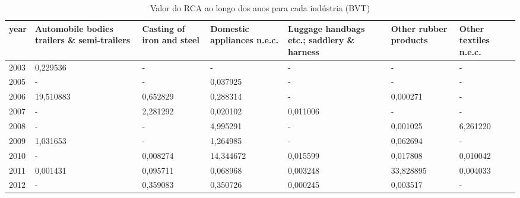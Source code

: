 \begin{table}
\centering
\caption{Valor do RCA ao longo dos anos para cada indústria (BVT)}
\begin{tabular}{p{1cm}p{2cm}p{2cm}p{2cm}p{2cm}p{2cm}p{2cm}}
\toprule
 year &  Automobile bodies trailers \& semi-trailers &  Casting of iron and steel &  Domestic appliances n.e.c. &  Luggage handbags etc.; saddlery \& harness &  Other rubber products &  Other textiles n.e.c. \\
\midrule
 2003 &                                    0,229536 &                          - &                           - &                                          - &                      - &                      - \\
 2005 &                                           - &                          - &                    0,037925 &                                          - &                      - &                      - \\
 2006 &                                   19,510883 &                   0,652829 &                    0,288314 &                                          - &               0,000271 &                      - \\
 2007 &                                           - &                   2,281292 &                    0,020102 &                                   0,011006 &                      - &                      - \\
 2008 &                                           - &                          - &                    4,995291 &                                          - &               0,001025 &               6,261220 \\
 2009 &                                    1,031653 &                          - &                    1,264985 &                                          - &               0,062694 &                      - \\
 2010 &                                           - &                   0,008274 &                   14,344672 &                                   0,015599 &               0,017808 &               0,010042 \\
 2011 &                                    0,001431 &                   0,095711 &                    0,068968 &                                   0,003248 &              33,828895 &               0,004033 \\
 2012 &                                           - &                   0,359083 &                    0,350726 &                                   0,000245 &               0,003517 &                      - \\

\end{tabular}
\end{table}
